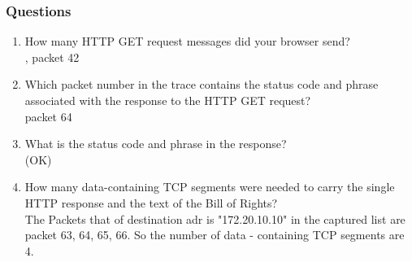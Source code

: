     \subsubsection*{Questions}
        \begin{enumerate}[label=\bfseries Problem \arabic*:,leftmargin=*,labelindent=1em]
        \addtocounter{enumi}{11}
            \item How many HTTP GET request messages did your browser send? \\[0.2mm]
            , packet 42
            
            \item Which packet number in the trace contains the status code and phrase associated with the response to the HTTP GET request?\\[0.2mm]
            \soln packet 64 
            
            \item What is the status code and phrase in the response?\\[0.2mm]
             (OK)
            
            \item How many data-containing TCP segments were needed to carry
            the single HTTP response and the text of the Bill of Rights? \\[0.2mm]
            \soln The Packets that of destination adr is "172.20.10.10" in the 
            captured list are packet 63, 64, 65, 66. So the number of 
            data - containing TCP segments are 4.
            
        \end{enumerate}
\newpage